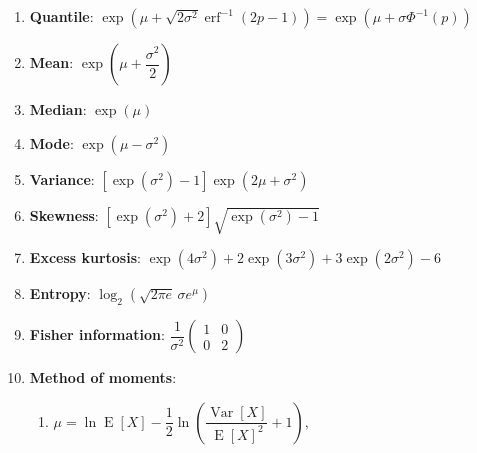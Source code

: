 \begin{enumerate}
    \item \textbf{Quantile}:
    $
        {\displaystyle {\exp \left(\mu +{\sqrt {2\sigma ^{2}}}\operatorname {erf} ^{-1}(2p-1)\right)
        =\exp(\mu +\sigma \Phi ^{-1}(p))}}
    $
    \hfill \cite{wiki/Log-normal_distribution}

    \item \textbf{Mean}: ${\displaystyle \exp \left(\mu +{\dfrac {\sigma ^{2}}{2}}\right)}$
    \hfill \cite{wiki/Log-normal_distribution}

    \item \textbf{Median}: ${\displaystyle \exp(\mu )}$
    \hfill \cite{wiki/Log-normal_distribution}

    \item \textbf{Mode}: ${\displaystyle \exp \left(\mu -\sigma ^{2}\right)}$
    \hfill \cite{wiki/Log-normal_distribution}

    \item \textbf{Variance}:
    ${\displaystyle \left[\exp(\sigma ^{2})-1\right]\exp \left(2\mu +\sigma ^{2}\right)}$
    \hfill \cite{wiki/Log-normal_distribution}

    \item \textbf{Skewness}:
    ${\displaystyle \left[\exp \left(\sigma ^{2}\right)+2\right]{\sqrt {\exp(\sigma ^{2})-1}}}$
    \hfill \cite{wiki/Log-normal_distribution}

    \item \textbf{Excess kurtosis}:
    ${\displaystyle \exp \left(4\sigma ^{2}\right)+2\exp \left(3\sigma ^{2}\right)+3\exp \left(2\sigma ^{2}\right)-6}$
    \hfill \cite{wiki/Log-normal_distribution}

    \item \textbf{Entropy}: ${\displaystyle \log _{2}\left({\sqrt {2\pi e}}\,\sigma e^{\mu }\right)}$
    \hfill \cite{wiki/Log-normal_distribution}

    \item \textbf{Fisher information}:
    ${\displaystyle {\dfrac {1}{\sigma ^{2}}}{\begin{pmatrix}1&0\\0&2\end{pmatrix}}}$
    \hfill \cite{wiki/Log-normal_distribution}

    \item \textbf{Method of moments}:
    \begin{enumerate}
        \item ${\displaystyle \mu =\ln \operatorname {E} [X]-{\dfrac {1}{2}}\ln \left({\dfrac {\operatorname {Var} [X]}{\operatorname {E} [X]^{2}}}+1\right),}$
        \hfill \cite{wiki/Log-normal_distribution}


\end{enumerate}
\end{enumerate}
